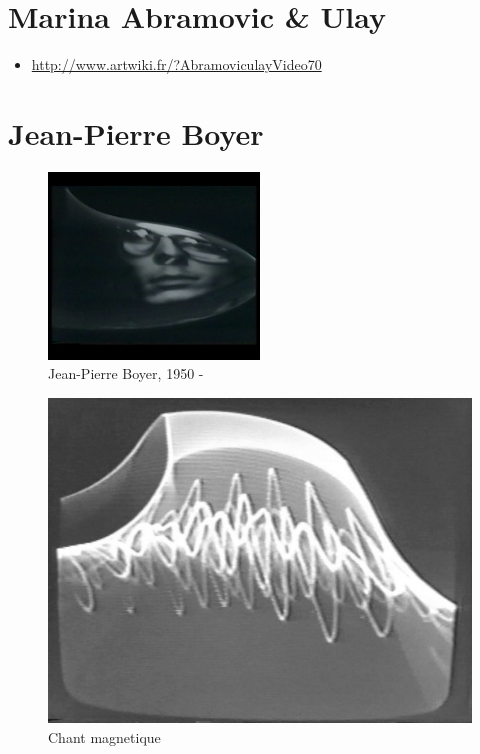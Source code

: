 \documentclass[
  french,
]{book}
\providecommand{\tightlist}{%
  \setlength{\itemsep}{0pt}\setlength{\parskip}{0pt}}
\begin{document}
\hypertarget{marina-abramovic-ulay}{%
\section{Marina Abramovic \& Ulay}\label{marina-abramovic-ulay}}

\begin{itemize}
\tightlist
\item
  \url{http://www.artwiki.fr/?AbramoviculayVideo70}
\end{itemize}

\hypertarget{jean-pierre-boyer}{%
\section{Jean-Pierre Boyer}\label{jean-pierre-boyer}}

\begin{figure}
\centering
\includegraphics[width=0.5\textwidth,height=\textheight]{medias/corpus/boyer/Portrait-e2288.jpg}
\caption{Jean-Pierre Boyer, 1950 -}
\end{figure}

\begin{figure}
\centering
\includegraphics{medias/corpus/boyer/Chant-magnetique.jpg}
\caption{Chant magnetique}
\end{figure}
\end{document}
